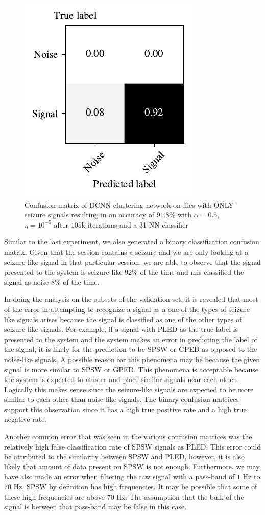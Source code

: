 \begin{figure}[!ht]
	\centering
	\includegraphics[width=0.425\linewidth]{pictures/conf_mat_exp_with_only_seizure_pooled.pdf}
	\caption[Binary Confusion Matrix on Sessions with only Seizure-Like Signals]{Confusion matrix of DCNN clustering network on files with ONLY seizure signals resulting in an accuracy of $91.8\%$ with $\alpha = 0.5$, $\eta = 10^{-5}$ after $105$k iterations and a 31-NN classifier}\label{fig:conf_mat_exp_with_only_seizure_pooled}  
\end{figure}

Similar to the last experiment, we also generated a binary classification confusion matrix. Given that the session contains a seizure and we are only looking at a seizure-like signal in that particular session, we are able to observe that the signal presented to the system is seizure-like 92\% of the time and mis-classified the signal as noise 8\% of the time. 

In doing the analysis on the subsets of the validation set, it is revealed that most of the error in attempting to recognize a signal as a one of the types of seizure-like signals arises because the signal is classified as one of the other types of seizure-like signals. For example, if a signal with PLED as the true label is presented to the system and the system makes an error in predicting the label of the signal, it is likely for the prediction to be SPSW or GPED as opposed to the noise-like signals. A possible reason for this phenomena may be because the given signal is more similar to SPSW or GPED. This phenomena is acceptable because the system is expected to cluster and place similar signals near each other. Logically this makes sense since the seizure-like signals are expected to be more similar to each other than noise-like signals. The binary confusion matrices support this observation since it has a high true positive rate and a high true negative rate. 

Another common error that was seen in the various confusion matrices was the relatively high false classification rate of SPSW signals as PLED. This error could be attributed to the similarity between SPSW and PLED, however, it is also likely that amount of data present on SPSW is not enough. Furthermore, we may have also made an error when filtering the raw signal with a pass-band of $1$ Hz to $70$ Hz. SPSW by definition has high frequencies. It may be possible that some of these high frequencies are above $70$ Hz. The assumption that the bulk of the signal is between that pass-band may be false in this case. 
